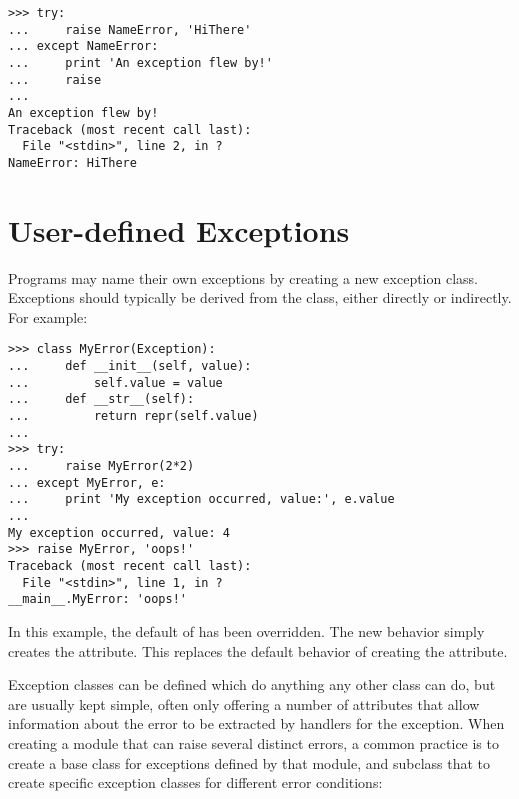 \documentclass{manual}
\begin{document}
\begin{verbatim}
>>> try:
...     raise NameError, 'HiThere'
... except NameError:
...     print 'An exception flew by!'
...     raise
...
An exception flew by!
Traceback (most recent call last):
  File "<stdin>", line 2, in ?
NameError: HiThere
\end{verbatim}


\section{User-defined Exceptions \label{userExceptions}}

Programs may name their own exceptions by creating a new exception
class.  Exceptions should typically be derived from the
 class, either directly or indirectly.  For
example:

\begin{verbatim}
>>> class MyError(Exception):
...     def __init__(self, value):
...         self.value = value
...     def __str__(self):
...         return repr(self.value)
... 
>>> try:
...     raise MyError(2*2)
... except MyError, e:
...     print 'My exception occurred, value:', e.value
... 
My exception occurred, value: 4
>>> raise MyError, 'oops!'
Traceback (most recent call last):
  File "<stdin>", line 1, in ?
__main__.MyError: 'oops!'
\end{verbatim}

In this example, the default  of 
has been overridden.  The new behavior simply creates the 
attribute.  This replaces the default behavior of creating the
 attribute.

Exception classes can be defined which do anything any other class can
do, but are usually kept simple, often only offering a number of
attributes that allow information about the error to be extracted by
handlers for the exception.  When creating a module that can raise
several distinct errors, a common practice is to create a base class
for exceptions defined by that module, and subclass that to create
specific exception classes for different error conditions:
\end{document}
